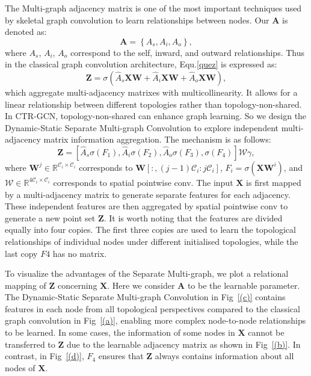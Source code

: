 \documentclass[10pt,twocolumn,letterpaper]{article}
\begin{document}
The Multi-graph adjacency matrix is one of the most important techniques used by skeletal graph convolution to learn relationships between nodes. Our $\mathbf{A}$ is denoted as:
\begin{equation}
  \mathbf{A}=\left\{ {{A}_{s}},{{A}_{i}},{{A}_{o}} \right\},
\end{equation}
where ${{A}_{s}}$, ${{A}_{i}}$, ${{A}_{o}}$ correspond to the self, inward, and outward relationships. Thus in the classical graph convolution architecture, Equ.\ref{quez} is expressed as:
\begin{equation}
  \mathbf{Z}=\sigma \left( {{{\hat{A}}}_{s}}\mathbf{XW}+{{{\hat{A}}}_{i}}\mathbf{XW}+{{{\hat{A}}}_{o}}\mathbf{XW} \right),
\end{equation}
which aggregate multi-adjacency matrixes with multicollinearity. It allows for a linear relationship between different topologies rather than topology-non-shared. In CTR-GCN, topology-non-shared can enhance graph learning. So we design the Dynamic-Static Separate Multi-graph Convolution to explore independent multi-adjacency matrix information aggregation. The mechanism is as follows:
\begin{equation}
    \mathbf{Z}=\left[ {{{\hat{A}}}_{s}}\sigma \left( F_1 \right),{{{\hat{A}}}_{i}}\sigma \left( F_2 \right), {{{\hat{A}}}_{o}}\sigma \left( F_3 \right),\sigma \left( F_4 \right) \right] \mathcal{W}\gamma,
\end{equation}
where ${{\mathbf{W}}^{j}}\in {{\mathbb{R}}^{{{\mathcal{C}}_{i}}\times {{\mathcal{C}}_{i}}}}$ corresponds to $\mathbf{W}[:,\left( j-1 \right){{\mathcal{C}}_{i}}:j{{\mathcal{C}}_{i}}]$, $F_i = \sigma \left( \mathbf{X}{{\mathbf{W}}^{i}} \right)$, and $\mathcal{W}\in {{\mathbb{R}}^{4{{\mathcal{C}}_{i}}\times {{\mathcal{C}}_{i}}}}$ corresponds to spatial pointwise conv. The input $\mathbf{X}$ is first mapped by a multi-adjacency matrix to generate separate features for each adjacency. These independent features are then aggregated by spatial pointwise conv to generate a new point set $\mathbf{Z}$. It is worth noting that the features are divided equally into four copies. The first three copies are used to learn the topological relationships of individual nodes under different initialised topologies, while the last copy $F4$ has no matrix.

To visualize the advantages of the Separate Multi-graph, we plot a relational mapping of $\mathbf{Z}$ concerning $\mathbf{X}$. Here we consider $\mathbf{A}$ to be the learnable parameter. The Dynamic-Static Separate Multi-graph Convolution in Fig~\ref{(c)} contains features in each node from all topological perspectives compared to the classical graph convolution in Fig~\ref{(a)}, enabling more complex node-to-node relationships to be learned. In some cases, the information of some nodes in $\mathbf{X}$ cannot be transferred to $\mathbf{Z}$ due to the learnable adjacency matrix as shown in Fig~\ref{(b)}. In contrast, in Fig~\ref{(d)}, $F_4$ ensures that $\mathbf{Z}$ always contains information about all nodes of $\mathbf{X}$.
\end{document}
